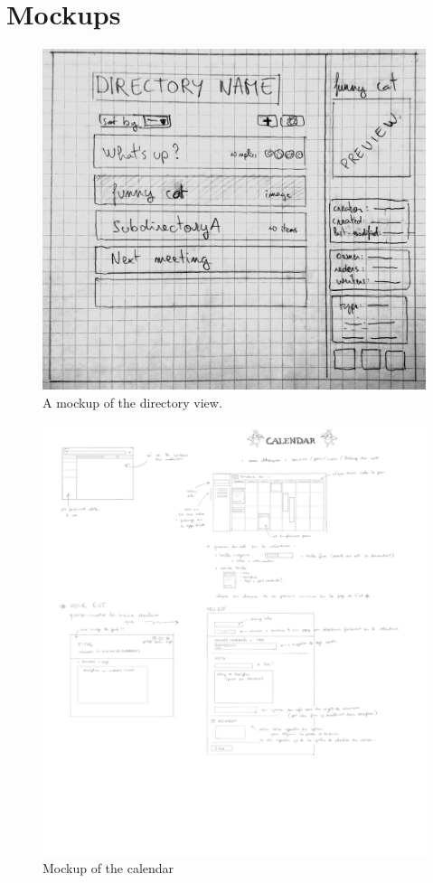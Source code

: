 \documentclass[a4paper, english]{report}
\begin{document}
\appendix
\label{chap:mockups}
\chapter{Mockups}

\begin{figure}[h]
\centering
\includegraphics[width=\linewidth,trim={0 1cm 0 0},clip]{mockups/directory.jpg}
\caption{A mockup of the directory view.}
\label{fig:mockup-taxo}
\end{figure}

\begin{figure}[h]
\centering
\includegraphics[width=\linewidth,trim={0 1cm 0 1cm},clip]{mockups/calendar-flupe.png}
\caption{Mockup of the calendar}
\label{fig:mockup-calendar}
\end{figure}
\end{document}
